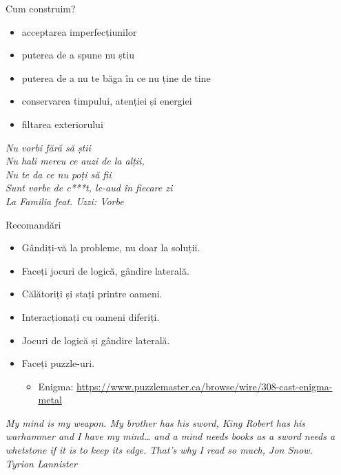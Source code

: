 \documentclass{beamer}
\begin{document}
\begin{frame}{Cum construim?}
  \begin{itemize}
    \pause \item acceptarea imperfecțiunilor
    \pause \item puterea de a spune nu știu
    \pause \item puterea de a nu te băga în ce nu ține de tine
    \pause \item conservarea timpului, atenției și energiei
    \pause \item filtarea exteriorului
  \end{itemize}
  \pause
  \vspace{5mm}
  \centering
  \textit{
  Nu vorbi fără să știi \\
  Nu hali mereu ce auzi de la alții, \\
  Nu te da ce nu poți să fii \\
  Sunt vorbe de c***t, le-aud în fiecare zi \\
  }
  \vspace{3mm}
  \hfill \textit{La Familia feat. Uzzi: Vorbe}
\end{frame}

\begin{frame}{Recomandări}
  \begin{itemize}
    \pause \item Gândiți-vă la probleme, nu doar la soluții.
    \pause \item Faceți jocuri de logică, gândire laterală.
    \pause \item Călătoriți și stați printre oameni.
    \pause \item Interacționați cu oameni diferiți.
    \pause \item Jocuri de logică și gândire laterală.
    \pause \item Faceți puzzle-uri.
      \begin{itemize}
        \item Enigma: \tiny{\url{https://www.puzzlemaster.ca/browse/wire/308-cast-enigma-metal}}
      \end{itemize}
  \end{itemize}
  \pause
  \vspace{5mm}
  \centering
  \textit{My mind is my weapon. My brother has his sword, King Robert has his warhammer and I have my mind\ldots{} and a mind needs books as a sword needs a whetstone if it is to keep its edge. That's why I read so much, Jon Snow.}\\
  \vspace{3mm}
  \hfill \textit{Tyrion Lannister}
\end{frame}
\end{document}
